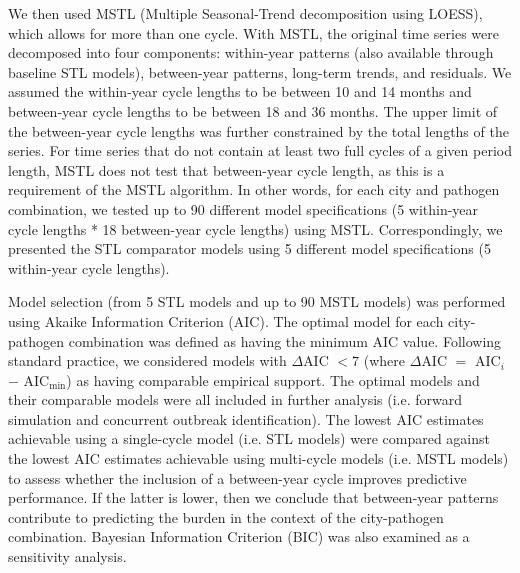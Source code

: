 We then used MSTL (Multiple Seasonal-Trend decomposition using LOESS), which allows for more than one cycle. 
With MSTL, the original time series were decomposed into four components: within-year patterns (also available through baseline STL models), between-year patterns, long-term trends, and residuals.
We assumed the within-year cycle lengths to be between 10 and 14 months and between-year cycle lengths to be between 18 and 36 months. 
The upper limit of the between-year cycle lengths was further constrained by the total lengths of the series. 
For time series that do not contain at least two full cycles of a given period length, MSTL does not test that between-year cycle length, as this is a requirement of the MSTL algorithm. 
In other words, for each city and pathogen combination, we tested up to 90 different model specifications (5 within-year cycle lengths * 18 between-year cycle lengths) using MSTL.
Correspondingly, we presented the STL comparator models using 5 different model specifications (5 within-year cycle lengths).

Model selection (from 5 STL models and up to 90 MSTL models) was performed using Akaike Information Criterion (AIC). 
The optimal model for each city-pathogen combination was defined as having the minimum AIC value. 
Following standard practice, we considered models with $\Delta$AIC $< 7$ (where $\Delta$AIC $= $ AIC$_i$ $-$ AIC$_{\text{min}}$) as having comparable empirical support. 
The optimal models and their comparable models were all included in further analysis (i.e. forward simulation and concurrent outbreak identification).
The lowest AIC estimates achievable using a single-cycle model (i.e. STL models) were compared against the lowest AIC estimates achievable using multi-cycle models (i.e. MSTL models) to assess whether the inclusion of a between-year cycle improves predictive performance.
If the latter is lower, then we conclude that between-year patterns contribute to predicting the burden in the context of the city-pathogen combination.
Bayesian Information Criterion (BIC) was also examined as a sensitivity analysis.

